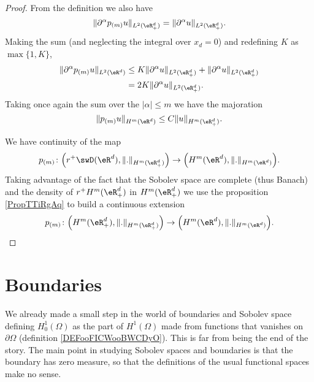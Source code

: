 \begin{proof}
    From the definition we also have
    \begin{equation}
        \| \partial^{\alpha}p_{(m)}u \|_{L^2(\eR^d_+)}=\| \partial^{\alpha}u \|_{L^2(\eR^d_+)}.
    \end{equation}
    Making the sum (and neglecting the integral over \( x_d=0\)) and redefining \(K \) as \( \max\{ 1,K \}\),
    \begin{subequations}
        \begin{align}
            \| \partial^{\alpha}p_{(m)}u \|_{L^2(\eR^d)}&\leq K \| \partial^{\alpha}u \|_{L^2(\eR^d_+)}+\| \partial^{\alpha}u \|_{L^2(\eR^d_+)}\\
            &=2K\| \partial^{\alpha}u \|_{L^2(\eR^d_+)}.
        \end{align}
    \end{subequations}
    Taking once again the sum over the \( | \alpha |\leq m\) we have the majoration 
    \begin{equation}
        \| p_{(m)}u \|_{H^m(\eR^d)}\leq C \| u \|_{H^m(\eR^d_+)}.
    \end{equation}

    We have continuity of the map
    \begin{equation}
        p_{(m)}\colon \Big( r^+\swD(\eR^d),\| . \|_{H^m(\eR^d_+)} \Big)\to \Big( H^m(\eR^d),\| . \|_{H^m(\eR^d)} \Big).
    \end{equation}
    Taking advantage of the fact that the Sobolev space are complete (thus Banach) and the density of \( r^+H^m(\eR^d_+)   \) in \( H^m(\eR^d_+)\) we use the proposition \ref{PropTTiRgAq} to build a continuous extension
    \begin{equation}
        p_{(m)}\colon \Big(  H^m(\eR^d_+)  ,\| . \|_{H^m(\eR^d_+)} \Big)\to \Big( H^m(\eR^d),\| . \|_{H^m(\eR^d)} \Big).
    \end{equation}
\end{proof}

\section{Boundaries}

We already made a small step in the world of boundaries and Sobolev space defining \( H_0^1(\Omega)\) as the part of \( H^1(\Omega)\) made from functions that vanishes on \( \partial\Omega\) (definition \ref{DEFooFICWooBWCDyO}). This is far from being the end of the story. The main point in studying Sobolev spaces and boundaries is that the boundary has zero measure, so that the definitions of the usual functional spaces make no sense.

